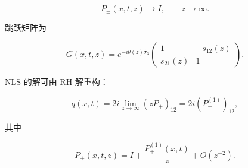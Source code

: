 \documentclass[
    lang=cn,
    scheme=chinese,
    mode=simple,
    device=normal,
    color=blue,
    math=cm,
    thmcnt=section,
    12pt,
    nowatermark
]{elegantbook}
\begin{document}
\begin{equation}
    P_\pm(x,t,z)\to I,
    \qquad z\to\infty.
    \tag{5.3.6}
    \label{eq:5.3.6}
\end{equation}

跳跃矩阵为

\begin{equation}
    G(x,t,z)
    =
    e^{-i\theta(z)\widehat{\sigma}_3}
    \begin{pmatrix}
        1         & -s_{12}(z) \\
        s_{21}(z) & 1
    \end{pmatrix}.
    \tag{5.3.7}
    \label{eq:5.3.7}
\end{equation}

NLS 的解可由 RH 解重构：

\begin{equation}
    q(x,t)
    =
    2i\lim\limits_{z\to\infty}(zP_+)_{12}
    =
    2i(P_+^{(1)})_{12},
    \tag{5.3.8}
    \label{eq:5.3.8}
\end{equation}

其中

\begin{equation}
    P_+(x,t,z)
    =
    I+\dfrac{P_+^{(1)}(x,t)}{z}
    +O(z^{-2}).
    \tag{5.3.9}
    \label{eq:5.3.9}
\end{equation}






\end{document}

